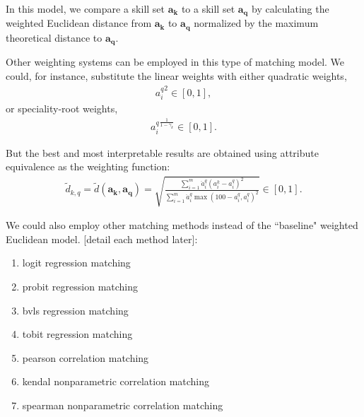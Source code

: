 \documentclass{elsarticle} %
\begin{document}
In this model, we compare a skill set $\boldsymbol{a_k}$ to a skill set
$\boldsymbol{a_q}$ by calculating the weighted Euclidean distance from
$\boldsymbol{a_k}$ to $\boldsymbol{a_q}$ normalized by the maximum theoretical
distance to $\boldsymbol{a_q}$.

Other weighting systems can be employed in this type of matching model. We
could, for instance, substitute the linear weights with either quadratic
weights,
\begin{gather}
    {a_{i}^{q}} ^ 2
    \in [0,1]
    ,
\end{gather}
or speciality-root weights,
\begin{gather}
    {a_{i}^{q}} ^ {
        \frac{1}{1 - \gamma_k}
    }
    \in [0,1]
    .
\end{gather}

But the best and most interpretable results are obtained using attribute
equivalence as the weighting function:
\begin{gather}
    \tilde{d}_{k,q} =
    \tilde{d}(\boldsymbol{a_k}, \boldsymbol{a_q}) =
    \sqrt{
    \frac{
    \sum_{i = 1}^{m}{
    \ddot{a}_{i}^{q} (a_{i}^{k} - a_{i}^{q})^2
    }
    }{
    \sum_{i = 1}^{m}{
    \ddot{a}_{i}^{q} \max(100 - a_{i}^{q}, a_{i}^{q})^2
    }
    }
    }
    \in [0,1]
    .
\end{gather}

We could also employ other matching methods instead of the ``baseline" weighted
Euclidean model. [detail each method later]:
\begin{enumerate}
    \item logit regression matching
    \item probit regression matching
    \item bvls regression matching
    \item tobit regression matching
    \item pearson correlation matching
    \item kendal nonparametric correlation matching
    \item spearman nonparametric correlation matching
\end{enumerate}
\end{document}
